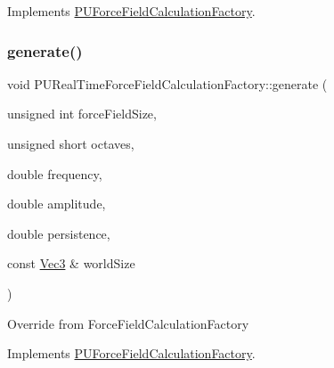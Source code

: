 Implements \hyperlink{classPUForceFieldCalculationFactory_ab2ec33f744eccdd1301aa9c12a3f54f9}{P\+U\+Force\+Field\+Calculation\+Factory}.

\mbox{\label{classPURealTimeForceFieldCalculationFactory_ac698047a4841663680ed761857e9ae20}} 
\subsubsection{\texorpdfstring{generate()}{generate()}\hspace{0.1cm}{\footnotesize\ttfamily [1/2]}}
{\footnotesize\ttfamily void P\+U\+Real\+Time\+Force\+Field\+Calculation\+Factory\+::generate (\begin{DoxyParamCaption}\item[{unsigned int}]{force\+Field\+Size,  }\item[{unsigned short}]{octaves,  }\item[{double}]{frequency,  }\item[{double}]{amplitude,  }\item[{double}]{persistence,  }\item[{const \hyperlink{classVec3}{Vec3} \&}]{world\+Size }\end{DoxyParamCaption})\hspace{0.3cm}{\ttfamily [virtual]}}

Override from Force\+Field\+Calculation\+Factory 

Implements \hyperlink{classPUForceFieldCalculationFactory_a8292a8ec09320a66c6ef130e98a7fd90}{P\+U\+Force\+Field\+Calculation\+Factory}.

\mbox{\label{classPURealTimeForceFieldCalculationFactory_a009d7bb7e28b4995a1600b3b1ac3895e}} 
